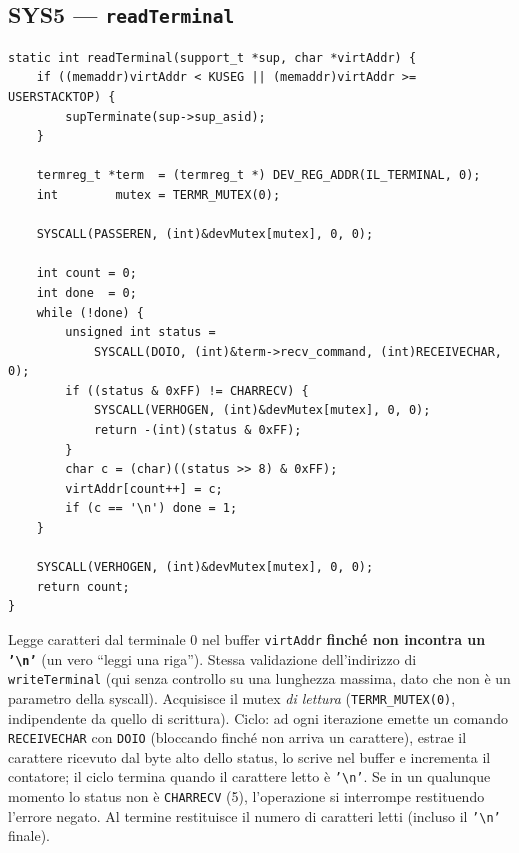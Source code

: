 \documentclass[11pt,a4paper]{article}
\newcommand{\code}[1]{\texttt{#1}}
\newcommand{\func}[1]{\textbf{\texttt{#1}}}
\begin{document}
\subsection{SYS5 --- \func{readTerminal}}
\begin{lstlisting}
static int readTerminal(support_t *sup, char *virtAddr) {
    if ((memaddr)virtAddr < KUSEG || (memaddr)virtAddr >= USERSTACKTOP) {
        supTerminate(sup->sup_asid);
    }

    termreg_t *term  = (termreg_t *) DEV_REG_ADDR(IL_TERMINAL, 0);
    int        mutex = TERMR_MUTEX(0);

    SYSCALL(PASSEREN, (int)&devMutex[mutex], 0, 0);

    int count = 0;
    int done  = 0;
    while (!done) {
        unsigned int status =
            SYSCALL(DOIO, (int)&term->recv_command, (int)RECEIVECHAR, 0);
        if ((status & 0xFF) != CHARRECV) {
            SYSCALL(VERHOGEN, (int)&devMutex[mutex], 0, 0);
            return -(int)(status & 0xFF);
        }
        char c = (char)((status >> 8) & 0xFF);
        virtAddr[count++] = c;
        if (c == '\n') done = 1;
    }

    SYSCALL(VERHOGEN, (int)&devMutex[mutex], 0, 0);
    return count;
}
\end{lstlisting}
Legge caratteri dal terminale 0 nel buffer \code{virtAddr}
\textbf{finché non incontra un \code{'\textbackslash n'}} (un vero
``leggi una riga''). Stessa validazione dell'indirizzo di
\code{writeTerminal} (qui senza controllo su una lunghezza massima, dato che
non è un parametro della syscall). Acquisisce il mutex \emph{di lettura}
(\code{TERMR\_MUTEX(0)}, indipendente da quello di scrittura). Ciclo: ad
ogni iterazione emette un comando \code{RECEIVECHAR} con \code{DOIO}
(bloccando finché non arriva un carattere), estrae il carattere ricevuto
dal byte alto dello status, lo scrive nel buffer e incrementa il contatore;
il ciclo termina quando il carattere letto è \code{'\textbackslash n'}. Se
in un qualunque momento lo status non è \code{CHARRECV} (5), l'operazione si
interrompe restituendo l'errore negato. Al termine restituisce il numero di
caratteri letti (incluso il \code{'\textbackslash n'} finale).
\end{document}
